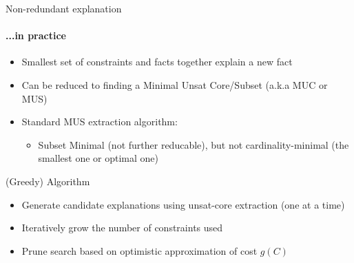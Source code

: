 \documentclass[handout]{beamer}
\begin{document}
\begin{frame}{Non-redundant explanation}
    \framesubtitle{...in practice}

    \begin{itemize}
        \item Smallest set of constraints and facts together explain a new fact
        \item Can be reduced to finding a Minimal Unsat Core/Subset (a.k.a MUC or MUS)
        \item Standard MUS extraction algorithm:
              \begin{itemize}
                  \item Subset Minimal (not further reducable), but not cardinality-minimal (the smallest one or optimal one)
              \end{itemize}
    \end{itemize}
\end{frame}

\begin{frame}{(Greedy) Algorithm}

    \begin{itemize}
            \item Generate candidate explanations using unsat-core extraction (one at a time)
            \item Iteratively grow the number of constraints used
            \item Prune search based on optimistic approximation of cost $g(C)$
    \end{itemize}
 
\end{frame}
\end{document}
